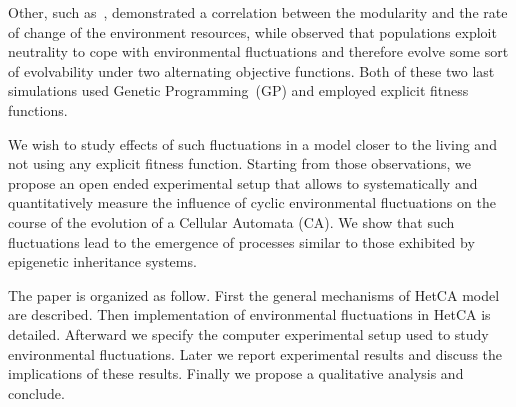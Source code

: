 Other, such as~\cite{lipson2002origin}, demonstrated a correlation between the modularity and the rate of change of the environment resources, while \cite{yu2007program} observed that populations exploit neutrality to cope with environmental fluctuations and therefore evolve some sort of evolvability under two alternating objective functions. Both of these two last simulations used Genetic Programming~(GP) and employed explicit fitness functions.

We wish to study effects of such fluctuations in a model closer to the living and not using any explicit fitness function. Starting from those observations, we propose an open ended experimental setup that allows to systematically and quantitatively measure the influence of cyclic environmental fluctuations on the course of the evolution of a Cellular Automata (CA). We show that such fluctuations lead to the emergence of processes similar to those exhibited by epigenetic inheritance systems. 

The paper is organized as follow. First the general mechanisms of HetCA model are described. Then implementation of environmental fluctuations in HetCA is detailed. Afterward we specify the computer experimental setup used to study environmental fluctuations. Later we report experimental results and discuss the implications of these results. Finally we propose a qualitative analysis and conclude.


